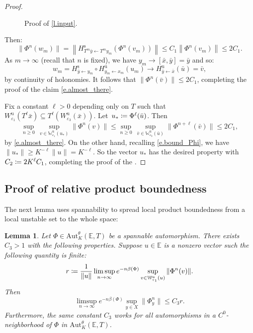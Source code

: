 \documentclass[JEP,XML,SOM,Unicode]{cedram}
\def\vcentcolon{\mathrel{\mathop\ordinarycolon}}
\providecommand\ordinarycolon{:}
\providecommand*\coloneqq{\vcentcolon\mathrel{\mkern-1.2mu}=}
\theoremstyle{plain}
\newtheorem{lemma}[theorem]{Lemma}
\theoremstyle{definition}
\newcommand{\EE}{\mathbb{E}}
\newcommand{\WW}{\mathbb{W}}
\newcommand{\uu}{\mathrm{u}}
\renewcommand{\ss}{\mathrm{s}}
\newcommand{\Aut}{\mathrm{Aut}}
\let\epsilon\varepsilon
\begin{document}
\begin{proof}
\begin{figure}[hbt]
\begin{center}
	\caption{Proof of \cref{l.input}.}\label{f.input}
	\end{center}
\end{figure}

Then:
\[
\|\Phi^n(w_m) \|
= \left\| H^\ss_{T^m \bar{y} \gets T^m y_m} (\Phi^n(v_m)) \right\|
\le C_1 \left\| \Phi^n(v_m) \right\|
\le 2C_1.
\]
As $m \to \infty$ (recall that $n$ is fixed), we have $y_m \to [\bar{x},\bar{y}] = \bar{y}$
and so:
\[
w_m = H^\ss_{\bar{y} \gets y_m} \circ H^\uu_{y_m \gets x_m}(u_m) \to H^\uu_{\bar{y} \gets \bar{x}}(\bar{u}) = \bar{v},
\]
by continuity of holonomies.
It follows that $\|\Phi^n(\bar{v}) \| \le 2 C_1$, completing the proof of the claim \eqref{e.almost_there}.

Fix a constant $\ell > 0$ depending only on $T$ such that $W^\uu_{\epsilon_1}(T^\ell \bar{x}) \subseteq T^\ell(W^\uu_{\epsilon_3}(\bar{x}))$.
Let~$u_* \coloneqq \Phi^\ell(\bar{u})$.
Then
\[
\sup_{n \ge 0} \, \sup_{v \in \WW^\uu_{\epsilon_1}(u_*)} \| \Phi^n (v) \| \le
\sup_{n \ge 0} \, \sup_{\bar{v} \in \WW^\uu_{\epsilon_3}(\bar{u})} \| \Phi^{n+\ell} (\bar{v}) \| \le 2C_1,
\]
by \eqref{e.almost_there}.
On the other hand, recalling \eqref{e.bound_Phi}, we have $\|u_*\| \ge K^{-\ell} \|u\| = K^{-\ell}$.
So the vector $u_*$ has the desired property with $C_2 \coloneqq 2 K^\ell C_1$, completing the proof of the .
\end{proof}

\subsection{Proof of relative product boundedness}\label{ss.bounded_proof}

The next lemma uses spannability to spread local product boundedness from a local unstable set to the whole space:

\begin{lemma}\label{l.key}
Let $\Phi\!\in\!\Aut^\theta_K(\EE,T)$ be a spannable automorphism.
There exists $C_3\!>\!1$ with the following properties.
Suppose $u \in \EE$ is a nonzero vector such the following quantity is finite:
\[
r \coloneqq \frac{1}{\|u\|}
\limsup_{n \to \infty} e^{-n \beta(\Phi)}\sup_{v \in \WW^\uu_{\epsilon_1}(u)} \|\Phi^n(v)\|.
\]
Then
\[
\limsup_{n \to \infty} e^{-n \beta(\Phi)} \sup_{y \in X} \|\Phi^n_y \| \le C_3 r.
\]
Furthermore, the same constant $C_3$ works for all automorphisms in a $C^0$-neighborhood of $\Phi$ in $\Aut^\theta_K(\EE,T)$.
\end{lemma}
\end{document}
